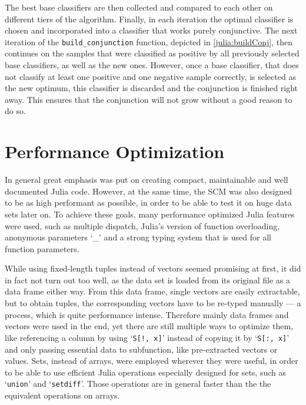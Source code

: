 The best base classifiers are then collected and compared to each other on different tiers of the algorithm.
Finally, in each iteration the optimal classifier is chosen and incorporated into a classifier that works purely conjunctive.
The next iteration of the \texttt{build\_conjunction} function, depicted in \autoref{julia:buildConj},
then continues on the samples that were classified as positive by all previously selected base classifiers, as well as the new ones.
However, once a base classifier, that does not classify at least one positive and one negative
sample correctly, is selected as the new optimum, this classifier is discarded and the conjunction is finished right away.
This ensures that the conjunction will not grow without a good reason to do so.

\section{Performance Optimization}

In general great emphasis was put on creating compact, maintainable and well documented Julia code.
However, at the same time, the SCM was also designed to be as high performant as possible,
in order to be able to test it on huge data sets later on.
To achieve these goals, many performance optimized Julia features were used, such as multiple dispatch, Julia's version of function overloading,
anonymous parameters `\_' and a strong typing system that is used for all function parameters.

While using fixed-length tuples instead of vectors seemed promising at first, it did in fact not turn out
too well, as the data set is loaded from its original file as a data frame either way.
From this data frame, single vectors are easily extractable, but to obtain tuples, the corresponding vectors have to be
re-typed manually --- a process, which is quite performance intense.
Therefore mainly data frames and vectors were used in the end, yet there are still multiple ways to optimize them, like
referencing a column by using `\texttt{S[!, x]}' instead of copying it by `\texttt{S[:, x]}' and only passing essential
data to subfunction, like pre-extracted vectors or values.
Sets, instead of arrays, were employed wherever they were useful, in order to be able to use efficient Julia operations especially designed for sets, such as `\texttt{union}' and `\texttt{setdiff}'.
Those operations are in general faster than the the equivalent operations on arrays. 

